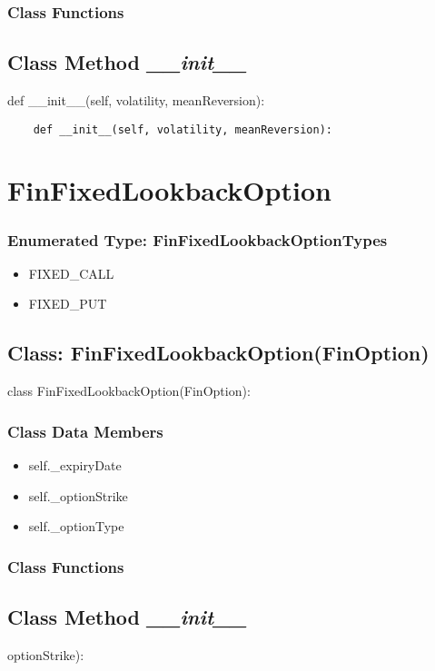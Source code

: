 \documentclass[twoside,11pt]{book}
\begin{document}
\subsubsection{Class Functions}

\subsection{Class Method {\it \_\_init\_\_}}
def \_\_init\_\_(self, volatility, meanReversion):

\begin{lstlisting}
    def __init__(self, volatility, meanReversion):
\end{lstlisting}

\newpage
\section{FinFixedLookbackOption}

\subsubsection{Enumerated Type: FinFixedLookbackOptionTypes}
\begin{itemize}
\item{FIXED\_CALL}
\item{FIXED\_PUT}
\end{itemize}

\subsection{Class: FinFixedLookbackOption(FinOption)}
class FinFixedLookbackOption(FinOption):

\subsubsection{Class Data Members}
\begin{itemize}
\item{self.\_expiryDate}
\item{self.\_optionStrike}
\item{self.\_optionType}
\end{itemize}

\subsubsection{Class Functions}

\subsection{Class Method {\it \_\_init\_\_}}
optionStrike):
\end{document}
